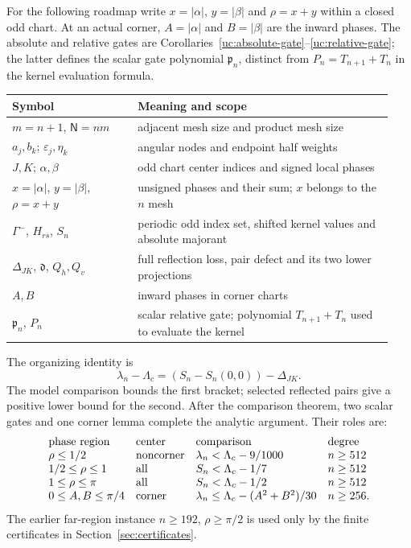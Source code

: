 For the following roadmap write $x=|\alpha|$, $y=|\beta|$ and
$\rho=x+y$ within a closed odd chart. At an actual corner, $A=|\alpha|$
and $B=|\beta|$ are the inward phases. The absolute and relative gates
are Corollaries~\ref{uc:absolute-gate}--\ref{uc:relative-gate}; the latter
defines the scalar gate polynomial $\mathfrak p_n$, distinct from
$P_n=T_{n+1}+T_n$ in the kernel evaluation formula.

\begin{center}
\begin{tabular}{@{}p{0.31\linewidth}p{0.63\linewidth}@{}}
\toprule
Symbol & Meaning and scope\\
\midrule
$m=n+1$, $\mathsf N=nm$ & adjacent mesh size and product mesh size\\
$a_j,b_k$; $\varepsilon_j,\eta_k$ & angular nodes and endpoint half weights\\
$J,K$; $\alpha,\beta$ & odd chart center indices and signed local phases\\
$x=|\alpha|$, $y=|\beta|$, $\rho=x+y$ & unsigned phases and their sum; $x$ belongs to the $n$ mesh\\
$\Gamma^-$, $H_{rs}$, $S_n$ & periodic odd index set, shifted kernel values and absolute majorant\\
$\Delta_{JK}$, $\mathfrak d$, $Q_h,Q_v$ & full reflection loss, pair defect and its two lower projections\\
$A,B$ & inward phases in corner charts\\
$\mathfrak p_n$, $P_n$ & scalar relative gate; polynomial $T_{n+1}+T_n$ used to evaluate the kernel\\
\bottomrule
\end{tabular}
\end{center}

The organizing identity is
\[
 \lambda_n-\Lambda_c=(S_n-S_n(0,0))-\Delta_{JK}.
\]
The model comparison bounds the first bracket; selected reflected
pairs give a positive lower bound for the second. After the comparison
theorem, two scalar gates and one corner lemma complete the analytic
argument. Their roles are:
\[
\begin{array}{l@{\quad}l@{\quad}l@{\quad}l}
\text{phase region}&\text{center}&\text{comparison}&\text{degree}\\
\rho\leq1/2&\text{noncorner}&\lambda_n<\Lambda_c-9/1000&n\geq512\\
1/2\leq\rho\leq1&\text{all}&S_n<\Lambda_c-1/7&n\geq512\\
1\leq\rho\leq\pi&\text{all}&S_n<\Lambda_c-1/2&n\geq512\\
0\leq A,B\leq\pi/4&\text{corner}&
 \lambda_n\leq\Lambda_c-(A^2+B^2)/30&n\geq256.
\end{array}
\]
The earlier far-region instance $n\geq192$, $\rho\geq\pi/2$ is
used only by the finite certificates in Section~\ref{sec:certificates}.

